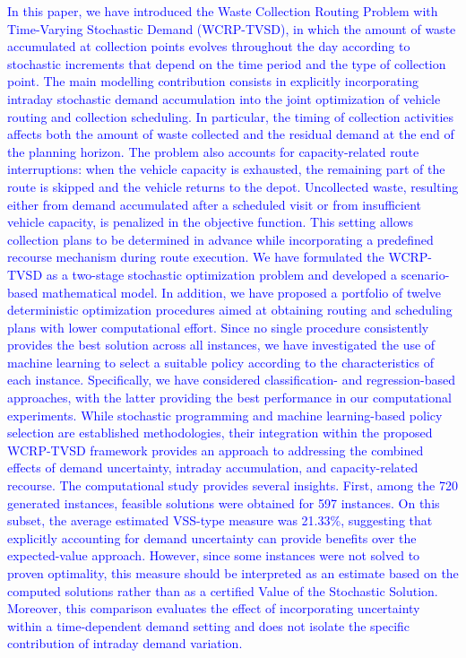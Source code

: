 \documentclass[authoryear,preprint,12pt]{elsarticle}
\newcommand{\rev}[1]{\textcolor{blue}{{#1}}}
\begin{document}
\rev{In this paper, we have introduced the Waste Collection Routing Problem with Time-Varying Stochastic Demand (WCRP-TVSD), in which the amount of waste accumulated at collection points evolves throughout the day according to stochastic increments that depend on the time period and the type of collection point. The main modelling contribution consists in explicitly incorporating intraday stochastic demand accumulation into the joint optimization of vehicle routing and collection scheduling. In particular, the timing of collection activities affects both the amount of waste collected and the residual demand at the end of the planning horizon. The problem also accounts for capacity-related route interruptions: when the vehicle capacity is exhausted, the remaining part of the route is skipped and the vehicle returns to the depot. Uncollected waste, resulting either from demand accumulated after a scheduled visit or from insufficient vehicle capacity, is penalized in the objective function. This setting allows collection plans to be determined in advance while incorporating a predefined recourse mechanism during route execution. We have formulated the WCRP-TVSD as a two-stage stochastic optimization problem and developed a scenario-based mathematical model. In addition, we have proposed a portfolio of twelve deterministic optimization procedures aimed at obtaining routing and scheduling plans with lower computational effort. Since no single procedure consistently provides the best solution across all instances, we have investigated the use of machine learning to select a suitable policy according to the characteristics of each instance. Specifically, we have considered classification- and regression-based approaches, with the latter providing the best performance in our computational experiments. While stochastic programming and machine learning-based policy selection are established methodologies, their integration within the proposed WCRP-TVSD framework provides an approach to addressing the combined effects of demand uncertainty, intraday accumulation, and capacity-related recourse. The computational study provides several insights. First, among the 720 generated instances, feasible solutions were obtained for 597 instances. On this subset, the average estimated VSS-type measure was 21.33\%, suggesting that explicitly accounting for demand uncertainty can provide benefits over the expected-value approach. However, since some instances were not solved to proven optimality, this measure should be interpreted as an estimate based on the computed solutions rather than as a certified Value of the Stochastic Solution. Moreover, this comparison evaluates the effect of incorporating uncertainty within a time-dependent demand setting and does not isolate the specific contribution of intraday demand variation.

}
\end{document}
